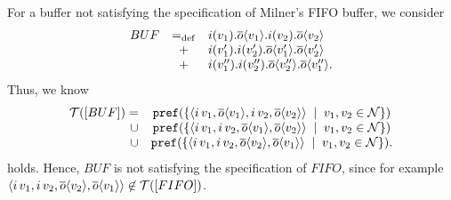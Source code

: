 For a buffer not satisfying the specification of Milner's FIFO buffer, we consider
\begin{align*}
\begin{array}{rcl}
	BUF&=_{\mathrm{def}}&i(v_1).\overline{o}\langle v_1\rangle.i(v_2).\overline{o}\langle v_2\rangle\\
			& +& i(v_1').i(v_2').\overline{o}\langle v_1'\rangle.\overline{o}\langle v_2'\rangle\\
			& +& i(v_1'').i(v_2'').\overline{o}\langle v_2''\rangle.\overline{o}\langle v_1''\rangle.
\end{array}
\end{align*}
Thus, we know
\begin{align*}
\begin{array}{rcl}
 \traces[BUF]=&\pref{\set[v_1,v_2\in\names]{\seq{\inpa{i}{v_1},\outa{o}{v_1},\inpa{i}{v_2},\out{o}{v_2}}}} \\
\cup&\pref{\set[v_1,v_2\in\names]{\seq{\inpa{i}{v_1},\inpa{i}{v_2},\outa{o}{v_1},\outa{o}{v_2}}}}\\
\cup&\pref{\set[v_1,v_2\in\names]{\seq{\inpa{i}{v_1},\inpa{i}{v_2},\outa{o}{v_2},\outa{o}{v_1}}}}.
\end{array}
\end{align*}
holds. Hence, $BUF$ is not satisfying the specification of $FIFO$, since for example $\seq{\inpa{i}{v_1},\inpa{i}{v_2},\outa{o}{v_2},\outa{o}{v_1}}\nin\traces[FIFO]$.






